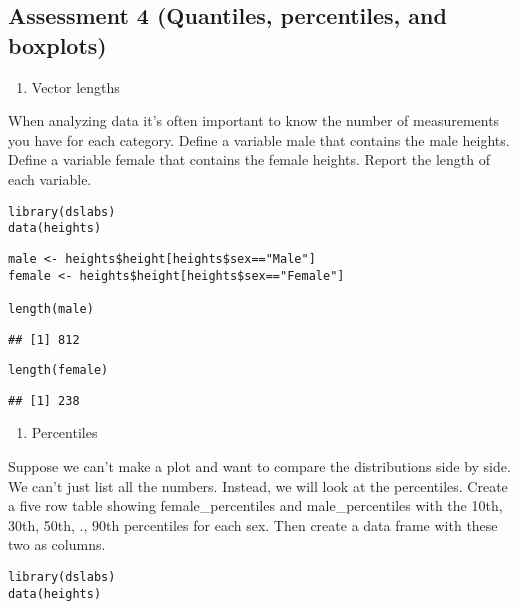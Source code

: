 \documentclass[]{article}
\providecommand{\tightlist}{%
  \setlength{\itemsep}{0pt}\setlength{\parskip}{0pt}}
\begin{document}
\hypertarget{assessment-4-quantiles-percentiles-and-boxplots}{%
\subsection{Assessment 4 (Quantiles, percentiles, and
boxplots)}\label{assessment-4-quantiles-percentiles-and-boxplots}}

\begin{enumerate}
\def\labelenumi{\arabic{enumi}.}
\tightlist
\item
  Vector lengths
\end{enumerate}

When analyzing data it's often important to know the number of
measurements you have for each category. Define a variable male that
contains the male heights. Define a variable female that contains the
female heights. Report the length of each variable.

\begin{verbatim}
library(dslabs)
data(heights)
\end{verbatim}

\begin{verbatim}
male <- heights$height[heights$sex=="Male"]
female <- heights$height[heights$sex=="Female"]

length(male)
\end{verbatim}

\begin{verbatim}
## [1] 812
\end{verbatim}

\begin{verbatim}
length(female)
\end{verbatim}

\begin{verbatim}
## [1] 238
\end{verbatim}

\begin{enumerate}
\def\labelenumi{\arabic{enumi}.}
\setcounter{enumi}{1}
\tightlist
\item
  Percentiles
\end{enumerate}

Suppose we can't make a plot and want to compare the distributions side
by side. We can't just list all the numbers. Instead, we will look at
the percentiles. Create a five row table showing female\_percentiles and
male\_percentiles with the 10th, 30th, 50th, ., 90th percentiles for
each sex. Then create a data frame with these two as columns.

\begin{verbatim}
library(dslabs)
data(heights)
\end{verbatim}
\end{document}
